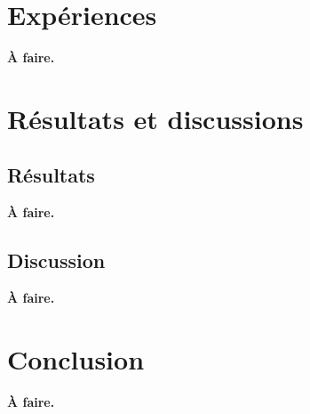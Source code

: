 \documentclass{rapport}
\theoremstyle{definition}
\theoremstyle{remark}
\theoremstyle{plain}
\theoremstyle{definition}
\theoremstyle{remark}
\begin{document}
\section{Expériences}
\textbf{À faire.}

\section{Résultats et discussions}
\subsection{Résultats}
\textbf{À faire.}

\subsection{Discussion}
\textbf{À faire.}

\section{Conclusion}
\textbf{À faire.}



\end{document}

